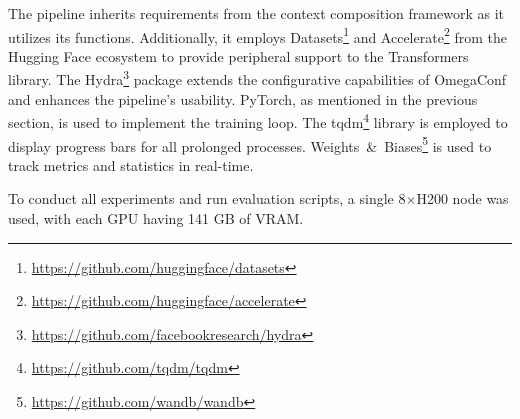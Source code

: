 The pipeline inherits requirements from the context composition framework as it utilizes its functions. Additionally, it employs Datasets\footnote{\url{https://github.com/huggingface/datasets}} and Accelerate\footnote{\url{https://github.com/huggingface/accelerate}} from the Hugging Face ecosystem to provide peripheral support to the Transformers library. The Hydra\footnote{\url{https://github.com/facebookresearch/hydra}} package extends the configurative capabilities of OmegaConf and enhances the pipeline's usability. PyTorch, as mentioned in the previous section, is used to implement the training loop. The tqdm\footnote{\url{https://github.com/tqdm/tqdm}} library is employed to display progress bars for all prolonged processes. Weights~\&~Biases\footnote{\url{https://github.com/wandb/wandb}} is used to track metrics and statistics in real-time.


To conduct all experiments and run evaluation scripts, a single 8\(\times\)H200 node was used, with each GPU having 141 GB of VRAM.
